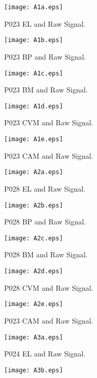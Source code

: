 \documentclass[transmag]{IEEEtran}
\begin{document}
\begin{sidewaysfigure*}
	\centering
	\begin{subfigure}[b]{0.18\textwidth}
		\texttt{[image: A1a.eps]}
		\caption{P023 EL and Raw Signal.}
	\end{subfigure}
	\begin{subfigure}[b]{0.18\textwidth}
		\texttt{[image: A1b.eps]}
		\caption{P023 BP and Raw Signal.}
	\end{subfigure}
	\begin{subfigure}[b]{0.18\textwidth}
		\texttt{[image: A1c.eps]}
		\caption{P023 BM and Raw Signal.}
	\end{subfigure}
	\begin{subfigure}[b]{0.18\textwidth}
		\texttt{[image: A1d.eps]}
		\caption{P023 CVM and Raw Signal.}
	\end{subfigure}
	\begin{subfigure}[b]{0.18\textwidth}
	\texttt{[image: A1e.eps]}
	\caption{P023 CAM and Raw Signal.}
	\end{subfigure}
	\hfill
	\begin{subfigure}[b]{0.18\textwidth}
		\texttt{[image: A2a.eps]}
		\caption{P028 EL and Raw Signal.}
	\end{subfigure}
	\begin{subfigure}[b]{0.18\textwidth}
		\texttt{[image: A2b.eps]}
		\caption{P028 BP and Raw Signal.}
	\end{subfigure}
	\begin{subfigure}[b]{0.18\textwidth}
		\texttt{[image: A2c.eps]}
		\caption{P028 BM and Raw Signal.}
	\end{subfigure}
	\begin{subfigure}[b]{0.18\textwidth}
		\texttt{[image: A2d.eps]}
		\caption{P028 CVM and Raw Signal.}
	\end{subfigure}
	\begin{subfigure}[b]{0.18\textwidth}
	\texttt{[image: A2e.eps]}
	\caption{P023 CAM and Raw Signal.}
	\end{subfigure}
	\hfill
	\begin{subfigure}[b]{0.18\textwidth}
		\texttt{[image: A3a.eps]}
		\caption{P024 EL and Raw Signal.}
	\end{subfigure}
	\begin{subfigure}[b]{0.18\textwidth}
		\texttt{[image: A3b.eps]}

\end{subfigure}
\end{sidewaysfigure*}
\end{document}
